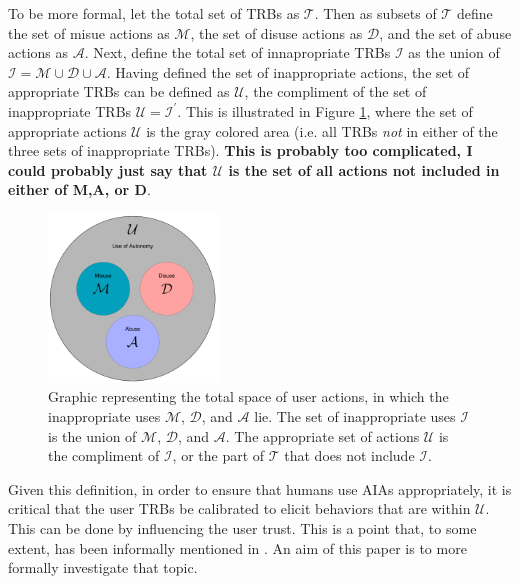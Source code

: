     To be more formal, let the total set of TRBs as $\mathcal{T}$. Then as subsets of $\mathcal{T}$ define the set of misue actions as $\mathcal{M}$, the set of disuse actions as $\mathcal{D}$, and the set of abuse actions as $\mathcal{A}$. Next, define the total set of innapropriate TRBs $\mathcal{I}$ as the union of $\mathcal{I} = \mathcal{M}\cup \mathcal{D}\cup\mathcal{A}$. Having defined the set of inappropriate actions, the set of appropriate TRBs can be defined as $\mathcal{U}$, the compliment of the set of inappropriate TRBs $\mathcal{U} = \mathcal{I}^\prime$. This is illustrated in Figure \ref{fig:appropriate_use}, where the set of appropriate actions $\mathcal{U}$ is the gray colored area (i.e. all TRBs \emph{not} in either of the three sets of inappropriate TRBs). \textbf{This is probably too complicated, I could probably just say that $\mathcal{U}$ is the set of all actions not included in either of M,A, or D}.
    
	\begin{figure}[htbp]
    	\centering
     	\includegraphics[width=0.4\textwidth]{Figures/misuse_disuse_abuse}
    	\caption{Graphic representing the total space of user actions, in which the inappropriate uses $\mathcal{M}$, $\mathcal{D}$, and $\mathcal{A}$ lie. The set of inappropriate uses $\mathcal{I}$ is the union of $\mathcal{M}$, $\mathcal{D}$, and $\mathcal{A}$. The appropriate set of actions $\mathcal{U}$ is the compliment of $\mathcal{I}$, or the part of $\mathcal{T}$ that does not include $\mathcal{I}$.}
        \label{fig:appropriate_use}
    \end{figure}
    
    Given this definition, in order to ensure that humans use AIAs appropriately, it is critical that the user TRBs be calibrated to elicit behaviors that are within $\mathcal{U}$. This can be done by influencing the user trust. This is a point that, to some extent, has been informally mentioned in \citet{Muir1994-ow,Muir1987-mk,Lillard2016-yg,Lee2004-pv}. An aim of this paper is to more formally investigate that topic.

